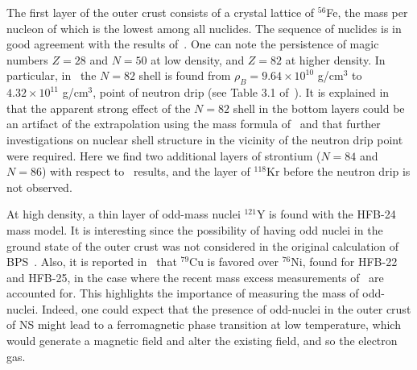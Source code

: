 The first layer of the outer crust consists of a crystal lattice of $^{56}$Fe,
the mass per nucleon of which is the lowest among all nuclides. The sequence of
nuclides is in good agreement with the results of~\cite{Haensel1994}. One can note
the persistence of magic numbers $Z=28$ and $N=50$ at low density, and $Z=82$ at
higher density. In particular, in~\cite{Haensel1994} the $N=82$ shell 
is found from $\rho_B = 9.64\times 10^{10}$ g/cm$^3$ to $4.32\times 10^{11}$
g/cm$^3$, point of neutron drip (see Table 3.1 of~\cite{Haensel2007}). It is 
explained in~\cite{Haensel2007} that 
the apparent strong effect of the $N=82$ shell in the bottom layers could be an 
artifact of the extrapolation using the mass formula of~\cite{Moller1988} and
that further investigations on nuclear shell structure in the vicinity of the
neutron drip point were required. Here we find two additional layers of
strontium ($N=84$ and $N=86$) with respect to~\cite{Haensel1994} results, and
the layer of $^{118}$Kr before the neutron drip is not observed. 

At high density, a thin layer of odd-mass nuclei $^{121}$Y is found
with the HFB-24 mass model. It is interesting since the possibility of having 
odd nuclei in the ground state of the outer crust was not considered in the
original calculation of BPS~\cite{BPS}. Also, it is reported
in~\cite{Pearson2018} that $^{79}$Cu is favored over $^{76}$Ni, found
for HFB-22 and HFB-25, in the case where the recent mass excess measurements
of~\cite{Welker2017} are accounted for. This highlights the importance
of measuring the mass of odd-nuclei. {Indeed, one could expect that the 
  presence of odd-nuclei in the outer crust of NS might lead to a ferromagnetic 
  phase transition at low temperature, which would generate a magnetic 
  field and alter the existing field, and so the electron gas.}

